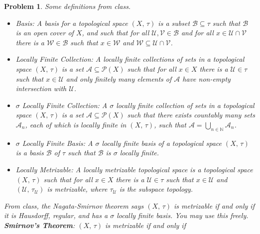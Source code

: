 \documentclass{article}
\theoremstyle{normal}
\newtheorem{problem}{Problem}
\begin{document}
    \begin{problem}
        Some definitions from class.
        \begin{itemize}
            \item Basis: A basis for a topological space $(X,\,\tau)$ is a
                subset $\mathcal{B}\subseteq\tau$ such that $\mathcal{B}$ is an
                open cover of $X$, and such that for all
                $\mathcal{U},\mathcal{V}\in\mathcal{B}$ and for all
                $x\in\mathcal{U}\cap\mathcal{V}$ there is a
                $\mathcal{W}\in\mathcal{B}$ such that $x\in\mathcal{W}$ and
                $\mathcal{W}\subseteq\mathcal{U}\cap\mathcal{V}$.
            \item Locally Finite Collection: A locally finite collections of
                sets in a topological space $(X,\,\tau)$ is a set
                $\mathcal{A}\subseteq\mathcal{P}(X)$ such that for all $x\in{X}$
                there is a $\mathcal{U}\in\tau$ such that $x\in\mathcal{U}$ and
                only finitely many elements of $\mathcal{A}$ have non-empty
                intersection with $\mathcal{U}$.
            \item $\sigma$ Locally Finite Collection: A $\sigma$ locally finite
                collection of sets in a topological space $(X,\,\tau)$ is a set
                $\mathcal{A}\subseteq\mathcal{P}(X)$ such that there exists
                countably many sets $\mathcal{A}_{n}$, each of which is locally
                finite in $(X,\,\tau)$, such that
                $\mathcal{A}=\bigcup_{n\in\mathbb{N}}\mathcal{A}_{n}$.
            \item $\sigma$ Locally Finite Basis: A $\sigma$ locally finite
                basis of a topological space $(X,\,\tau)$ is a basis
                $\mathcal{B}$ of $\tau$ such that $\mathcal{B}$ is $\sigma$
                locally finite.
            \item Locally Metrizable: A locally metrizable topological space
                is a topological space $(X,\,\tau)$ such that for all $x\in{X}$
                there is a $\mathcal{U}\in\tau$ such that $x\in\mathcal{U}$ and
                $(\mathcal{U},\,\tau_{\mathcal{U}})$ is metrizable, where
                $\tau_{\mathcal{U}}$ is the subspace topology.
        \end{itemize}
        From class, the Nagata-Smirnov theorem says $(X,\,\tau)$ is metrizable
        if and only if it is Hausdorff, regular,
        and has a $\sigma$ locally finite basis. You may use this freely.
        \textbf{Smirnov's Theorem}: $(X,\,\tau)$ is metrizable if and only if

\end{problem}
\end{document}
